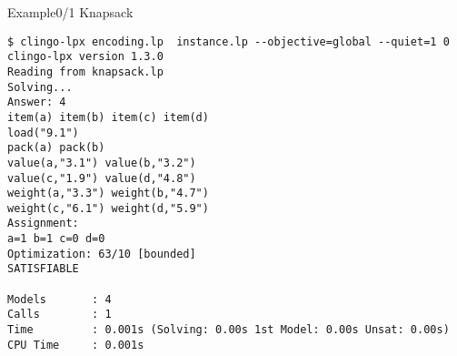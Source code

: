 \begin{frame}[fragile]{Example}{0/1 Knapsack}
\begin{adjustbox}{max totalsize={\textwidth}{.75\textheight},keepaspectratio}
\begin{lstlisting}
$ clingo-lpx encoding.lp  instance.lp --objective=global --quiet=1 0
clingo-lpx version 1.3.0
Reading from knapsack.lp
Solving...
Answer: 4
item(a) item(b) item(c) item(d)
load("9.1")
pack(a) pack(b)
value(a,"3.1") value(b,"3.2")
value(c,"1.9") value(d,"4.8")
weight(a,"3.3") weight(b,"4.7")
weight(c,"6.1") weight(d,"5.9")
Assignment:
a=1 b=1 c=0 d=0
Optimization: 63/10 [bounded]
SATISFIABLE

Models       : 4
Calls        : 1
Time         : 0.001s (Solving: 0.00s 1st Model: 0.00s Unsat: 0.00s)
CPU Time     : 0.001s
\end{lstlisting}
\end{adjustbox}
\end{frame}
%
